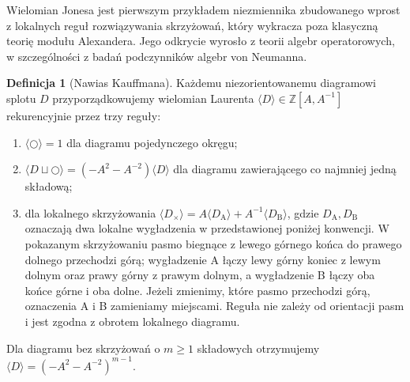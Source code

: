 \documentclass[11pt,a4paper]{report}
\numberwithin{equation}{section}
\theoremstyle{plain}
\theoremstyle{definition}
\newtheorem{definicja}[twierdzenie]{Definicja}
\theoremstyle{remark}
\begin{document}
Wielomian Jonesa jest pierwszym przykładem niezmiennika zbudowanego
wprost z lokalnych reguł rozwiązywania skrzyżowań, który wykracza
poza klasyczną teorię modułu Alexandera. Jego odkrycie wyrosło
z teorii algebr operatorowych, w szczególności z badań podczynników
algebr von Neumanna.

\begin{definicja}[Nawias Kauffmana]
Każdemu niezorientowanemu diagramowi splotu $D$ przyporządkowujemy
wielomian Laurenta $\langle D\rangle\in\mathbb Z[A,A^{-1}]$
rekurencyjnie przez trzy reguły:
\begin{enumerate}[label=(\roman*)]
\item $\langle\bigcirc\rangle=1$ dla diagramu pojedynczego okręgu;
\item $\langle D\sqcup\bigcirc\rangle=
(-A^2-A^{-2})\langle D\rangle$ dla diagramu zawierającego
co najmniej jedną składową;
\item dla lokalnego skrzyżowania
$\langle D_{\times}\rangle
=A\langle D_{\mathrm A}\rangle+A^{-1}\langle D_{\mathrm B}\rangle$,
gdzie $D_{\mathrm A},D_{\mathrm B}$ oznaczają dwa lokalne
wygładzenia w przedstawionej poniżej konwencji. W pokazanym
skrzyżowaniu pasmo biegnące z lewego górnego końca do prawego
dolnego przechodzi górą; wygładzenie A łączy lewy górny
koniec z lewym dolnym oraz prawy górny z prawym dolnym,
a wygładzenie B łączy oba końce górne i oba dolne.
Jeżeli zmienimy, które pasmo przechodzi górą, oznaczenia
A i B zamieniamy miejscami. Reguła nie zależy od orientacji
pasm i jest zgodna z obrotem lokalnego diagramu.
\end{enumerate}
Dla diagramu bez skrzyżowań o $m\geq1$ składowych otrzymujemy
$\langle D\rangle=(-A^2-A^{-2})^{m-1}$.
\end{definicja}

\begin{center}
\end{center}
\end{document}
